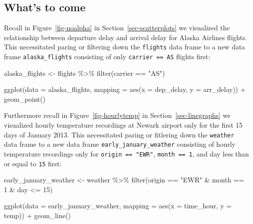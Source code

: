 \documentclass[
  letterpaper,
  DIV=11,
  numbers=noendperiod]{scrreprt}
\newenvironment{Shaded}{\begin{snugshade}}{\end{snugshade}}
\newcommand{\AttributeTok}[1]{\textcolor[rgb]{0.40,0.45,0.13}{#1}}
\newcommand{\DecValTok}[1]{\textcolor[rgb]{0.68,0.00,0.00}{#1}}
\newcommand{\FunctionTok}[1]{\textcolor[rgb]{0.28,0.35,0.67}{#1}}
\newcommand{\NormalTok}[1]{\textcolor[rgb]{0.00,0.23,0.31}{#1}}
\newcommand{\OtherTok}[1]{\textcolor[rgb]{0.00,0.23,0.31}{#1}}
\newcommand{\SpecialCharTok}[1]{\textcolor[rgb]{0.37,0.37,0.37}{#1}}
\newcommand{\StringTok}[1]{\textcolor[rgb]{0.13,0.47,0.30}{#1}}
\theoremstyle{definition}
\theoremstyle{remark}
\begin{document}
\hypertarget{sec-whats-to-come-3}{%
\subsection{What's to come}\label{sec-whats-to-come-3}}

Recall in Figure~\ref{fig-noalpha} in Section~\ref{sec-scatterplots} we
visualized the relationship between departure delay and arrival delay
for Alaska Airlines flights. This necessitated paring or filtering down
the \texttt{flights} data frame to a new data frame
\texttt{alaska\_flights} consisting of only \texttt{carrier\ ==\ AS}
flights first:

\begin{Shaded}
\begin{Highlighting}[]
\NormalTok{alaska\_flights }\OtherTok{\textless{}{-}}\NormalTok{ flights }\SpecialCharTok{\%\textgreater{}\%} 
  \FunctionTok{filter}\NormalTok{(carrier }\SpecialCharTok{==} \StringTok{"AS"}\NormalTok{)}

\FunctionTok{ggplot}\NormalTok{(}\AttributeTok{data =}\NormalTok{ alaska\_flights, }\AttributeTok{mapping =} \FunctionTok{aes}\NormalTok{(}\AttributeTok{x =}\NormalTok{ dep\_delay, }\AttributeTok{y =}\NormalTok{ arr\_delay)) }\SpecialCharTok{+} 
  \FunctionTok{geom\_point}\NormalTok{()}
\end{Highlighting}
\end{Shaded}

Furthermore recall in Figure~\ref{fig-hourlytemp} in
Section~\ref{sec-linegraphs} we visualized hourly temperature recordings
at Newark airport only for the first 15 days of January 2013. This
necessitated paring or fitlering down the \texttt{weather} data frame to
a new data frame \texttt{early\_january\_weather} consisting of hourly
temperature recordings only for \texttt{origin\ ==\ "EWR"},
\texttt{month\ ==\ 1}, and day less than or equal to \texttt{15} first:

\begin{Shaded}
\begin{Highlighting}[]
\NormalTok{early\_january\_weather }\OtherTok{\textless{}{-}}\NormalTok{ weather }\SpecialCharTok{\%\textgreater{}\%} 
  \FunctionTok{filter}\NormalTok{(origin }\SpecialCharTok{==} \StringTok{"EWR"} \SpecialCharTok{\&}\NormalTok{ month }\SpecialCharTok{==} \DecValTok{1} \SpecialCharTok{\&}\NormalTok{ day }\SpecialCharTok{\textless{}=} \DecValTok{15}\NormalTok{)}

\FunctionTok{ggplot}\NormalTok{(}\AttributeTok{data =}\NormalTok{ early\_january\_weather, }\AttributeTok{mapping =} \FunctionTok{aes}\NormalTok{(}\AttributeTok{x =}\NormalTok{ time\_hour, }\AttributeTok{y =}\NormalTok{ temp)) }\SpecialCharTok{+}
  \FunctionTok{geom\_line}\NormalTok{()}
\end{Highlighting}
\end{Shaded}
\end{document}
